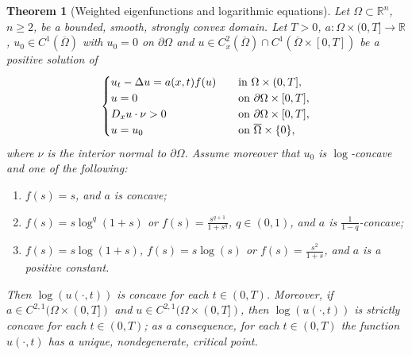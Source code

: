 \documentclass[11pt, reqno]{amsart}
\newtheorem{theorem}[lemma]{Theorem}
\theoremstyle{definition}
\numberwithin{equation}{section}
\newcommand{\Omegabar}{\overline{\Omega}}
\newcommand{\R}{\mathbb{R}}
\begin{document}
\begin{theorem}[Weighted eigenfunctions and logarithmic equations]
\label{thm_general_korevaar}
	Let $\Omega \subset \R^n$, $n\geq 2$, be a bounded, smooth, strongly convex domain. 
Let $T>0$, $a\colon\Omega\times(0,T]\to \R$, $u_0\in C^1(\Omegabar)$ 
with $u_0=0$ on $\partial\Omega$ and $u \in C^2_x(\Omegabar) \cap C^1(\Omegabar\times[0,T])$ be a positive solution of$$		
\begin{cases}
u_t - \Delta u = a(x,t) f(u) &\quad \hbox{in $\Omega \times (0,T]$}, \\
u=0 & \quad\text{on }\partial \Omega\times [0,T],	 \\
D_x u \cdot \nu >0 & \quad\text{on }\partial \Omega\times [0,T], \\
u =u_0 & \quad \text{on } \Omegabar \times \{0\},
\end{cases}
$$
where $\nu$ is the interior normal to $\partial \Omega$. 
Assume moreover that $u_0$ is $\log$-concave and one of the following:
\begin{enumerate}[label=\textit{\roman*})]
\item $f(s)=s$, and $a$ is concave; 
\item $f(s)=s \log^q(1+s)$ or $f(s)=\frac{s^{q+1}}{1+s^q}$, $q \in (0,1)$, and $a$ is $\frac{1}{1-q}$-concave;
 \item $f(s)=s \log(1+s)$, $f(s)=s \log(s)$ or $f(s)=\frac{s^2}{1+s}$, and $a$ is a positive constant. 
\end{enumerate}
Then $\log(u(\cdot, t))$ is concave for each $t \in (0,T)$. Moreover, if  $a \in C^{2,1}(\Omega\times(0,T])$ and $u \in C^{2,1}(\Omega\times(0,T])$, then $\log(u(\cdot, t))$ is strictly concave for each $t \in (0,T)$; as a consequence, for each $t \in (0,T)$ the function $u(\cdot, t)$ has a unique, nondegenerate, critical point.
\end{theorem}
\end{document}
